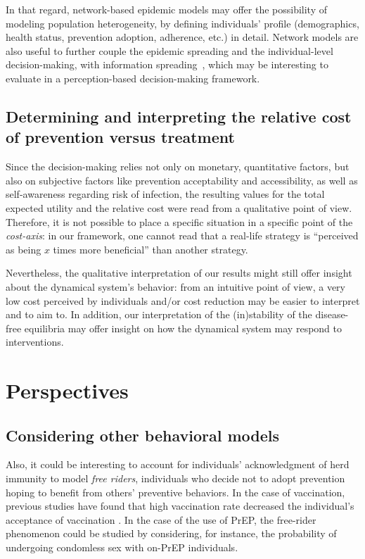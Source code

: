 In that regard, network-based epidemic models may offer the possibility of modeling population heterogeneity, by defining individuals' profile (demographics, health status, prevention adoption, adherence, etc.) in detail. Network models are also useful to further couple the epidemic spreading and the individual-level decision-making, with information spreading~\cite[]{Chang2020}, which may be interesting to evaluate in a perception-based decision-making framework.


\subsection{Determining and interpreting the relative cost of prevention versus treatment}
Since the decision-making relies not only on monetary, quantitative factors, but also on subjective factors like prevention acceptability and accessibility, as well as self-awareness regarding risk of infection, the resulting values for the total expected utility and the relative cost were read from a qualitative point of view. 
%
Therefore, it is not possible to place a specific situation in a specific point of the {\it cost-axis}: in our framework, one cannot read that a real-life strategy is ``perceived as being $x$ times more beneficial'' than another strategy. 

Nevertheless, the qualitative interpretation of our results might still offer insight about the dynamical system's behavior: from an intuitive point of view, a very low cost perceived by individuals and/or cost reduction may be easier to interpret and to aim to. In addition, our interpretation of the (in)stability of the disease-free equilibria may offer insight on how the dynamical system may respond to interventions. 


\section{Perspectives}

\subsection{Considering other behavioral models}
Also, it could be interesting to account for individuals' acknowledgment of herd immunity to model \textit{free riders}, individuals who decide not to adopt prevention hoping to benefit from others' preventive behaviors. In the case of vaccination, previous studies have found that high vaccination rate decreased the individual's acceptance of vaccination \cite[]{Ibuka2014}. In the case of the use of PrEP, the free-rider phenomenon could be studied by considering, for instance, the probability of undergoing condomless sex with on-PrEP individuals. 

